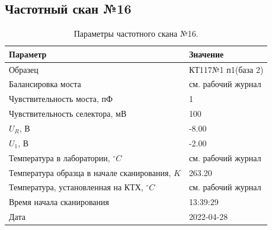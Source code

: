 \subsection{Частотный скан №16}
\begin{table}[!ht]
    \centering
    \caption{Параметры частотного скана №16.}
    \begin{tabular}{|l|l|}
        \hline
        Параметр                                       & Значение                  \\ \hline
        Образец                                        & КТ117№1 п1(база 2)        \\ \hline
        Балансировка моста                             & см. рабочий журнал        \\ \hline
        Чувствительность моста, пФ                     & 1                         \\ \hline
        Чувствительность селектора, мВ                 & 100                       \\ \hline
        $U_R$, В                                       & -8.00                     \\ \hline
        $U_1$, В                                       & -2.00                     \\ \hline
        Температура в лаборатории, $^\circ C$          & см. рабочий журнал        \\ \hline
        Температура образца в начале сканирования, $K$ & 263.20                    \\ \hline
        Температура, установленная на КТХ, $^\circ C$  & см. рабочий журнал        \\ \hline
        Время начала сканирования                      & 13:39:29                  \\ \hline
        Дата                                           & 2022-04-28                \\ \hline
    \end{tabular}
    \label{table:frequency_scan_16}
\end{table}

